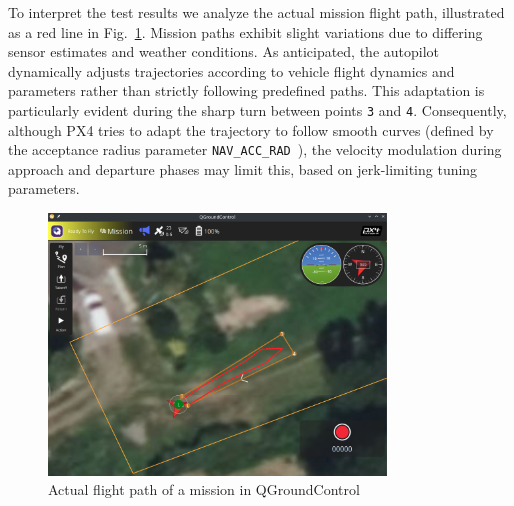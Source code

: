 To interpret the test results we analyze the actual mission flight path,
illustrated as a red line in Fig.~\ref{fig:mission-final-actual}.
Mission paths exhibit slight variations due to differing sensor estimates and
weather conditions.
%
As anticipated, the autopilot dynamically adjusts trajectories according to
vehicle flight dynamics and parameters rather than strictly following predefined
paths. This adaptation is particularly evident during the sharp turn between
points \lstinline{3} and \lstinline{4}.
%
Consequently, although PX4 tries to adapt the trajectory to follow smooth
curves (defined by the acceptance radius parameter
\lstinline{NAV_ACC_RAD}~\cite{px4MissionModePath}), the velocity modulation
during approach and departure phases may limit this, based on jerk-limiting tuning parameters.

\begin{figure}[!hbt]
  \centering
  \includegraphics[width=0.8\textwidth]{./img/png/mission-final-actual} 
  \caption{Actual flight path of a mission in QGroundControl}%
  \label{fig:mission-final-actual}
\end{figure}


